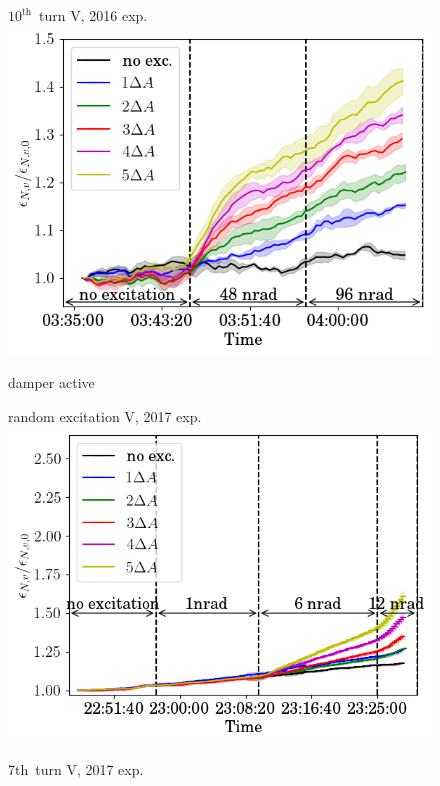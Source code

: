 \documentclass[%
 reprint,
 amsmath,amssymb,
 aps,
prstab,
longbibliography
]{revtex4-1}
\begin{document}
\begin{figure}
\begin{minipage}[t]{0.32\linewidth}
		\centering
		$10^{\mathrm{th}}$~turn V, 2016 exp.\\
		\includegraphics[height=0.75\linewidth]{2016_emitv_avg_rel_v10th_no_damper_no_text.png}
	\end{minipage}	
	damper active\\
	\begin{minipage}[t]{0.32\linewidth}
		\centering
		random excitation V, 2017 exp.\\
		\includegraphics[height=0.75\linewidth]{2017_emitv_avg_rel_vran_with_damper.png}
	\end{minipage}	
	\begin{minipage}[t]{0.32\linewidth}
		\centering
		7th~turn V, 2017 exp.\\

\end{minipage}
\end{figure}
\end{document}
